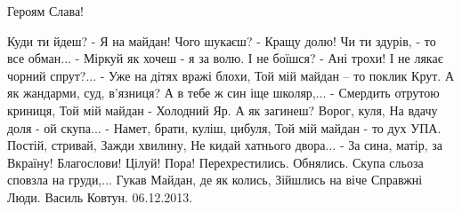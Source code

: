 \begin{itemize}
Героям Слава!


Куди ти йдеш?
- Я на майдан!
Чого шукаєш?
- Кращу долю!
Чи ти здурів, - то все обман...
- Міркуй як хочеш - я за волю.
І не боїшся?
- Ані трохи!
І не лякає чорний спрут?...
- Уже на дітях вражі блохи,
Той мій майдан – то поклик Крут.
А як жандарми, суд, в’язниця?
А в тебе ж син іще школяр,...
- Смердить отрутою криниця,
Той мій майдан - Холодний Яр.
А як загинеш?
Ворог, куля,
На вдачу доля - ой скупа...
- Намет, брати, куліш, цибуля,
Той мій майдан - то дух УПА.
Постій, стривай,
Зажди хвилину,
Не кидай хатнього двора...
- За сина, матір, за Вкраїну!
Благослови! Цілуй! Пора!
Перехрестились. Обнялись.
Скупа сльоза сповзла на груди,...
Гукав Майдан, де як колись,
Зійшлись на віче Справжні Люди.
Василь Ковтун. 06.12.2013.

\end{itemize} %
